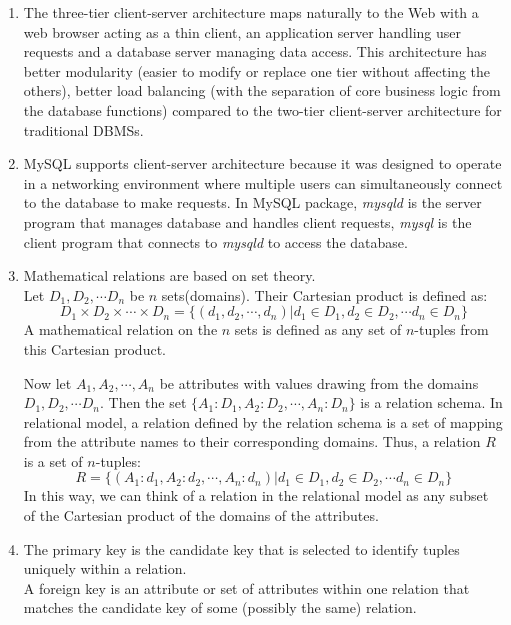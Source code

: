 \documentclass[11pt]{article}
\begin{document}
\begin{enumerate}
\item The three-tier client-server architecture maps naturally to
  the Web with a web browser acting as a thin client, an application
  server handling user requests and a database server managing data
  access. This architecture has better modularity (easier to modify
  or replace one tier without affecting the others), better load
  balancing (with the separation of core business logic from the
  database functions) compared to the two-tier client-server
  architecture for traditional DBMSs.

\item MySQL supports client-server architecture because it was
  designed to operate in a networking environment where multiple users
  can simultaneously connect to the database to make requests. In
  MySQL package, \emph{mysqld} is the server program that manages
  database and handles client requests, \emph{mysql} is the client
  program that connects to \emph{mysqld} to access the database.

\item Mathematical relations are based on set theory.\\
  Let $D_1,D_2, \cdots D_n$ be $n$ sets(domains). Their Cartesian
  product is defined as:
  \begin{equation}
    D_1 \times D_2 \times \cdots \times D_n = \{(d_1,d_2,\cdots,d_n) |
    d_1 \in D_1, d_2 \in D_2, \cdots d_n \in D_n\}
  \end{equation}
  A mathematical relation on the $n$ sets is defined as any set of
  $n$-tuples from this Cartesian product.

  Now let $A_1,A_2,\cdots,A_n$ be attributes with values drawing from
  the domains $D_1,D_2, \cdots D_n$. Then the set
  $\{A_1:D_1,A_2:D_2,\cdots,A_n:D_n\}$ is a relation schema. In
  relational model, a relation defined by the relation schema is a set
  of mapping from the attribute names to their corresponding
  domains. Thus, a relation $R$ is a set of $n$-tuples:
  \begin{equation}
    R = \{(A_1:d_1,A_2:d_2,\cdots,A_n:d_n) | d_1 \in D_1, d_2 \in D_2,
    \cdots d_n \in D_n\}
  \end{equation}
  In this way, we can think of a relation in the relational model as
  any subset of the Cartesian product of the domains of the
  attributes.

\item 
  The primary key is the candidate key that is selected to identify
  tuples uniquely within a relation.\\
  A foreign key is an attribute or set of attributes within one
  relation that matches the candidate key of some (possibly the same)
  relation.


\end{enumerate}
\end{document}
